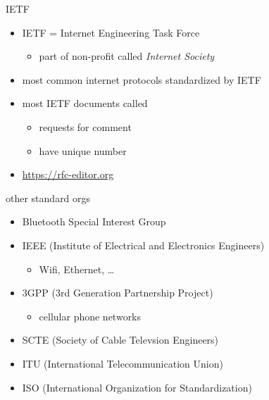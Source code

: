 \begin{frame}{IETF}
    \begin{itemize}
    \item IETF = Internet Engineering Task Force
        \begin{itemize}
        \item part of non-profit called \textit{Internet Society}
        \end{itemize}
    \item most common internet protocols standardized by IETF
    \item most IETF documents called 
        \begin{itemize}
        \item requests for comment
        \item have unique number
        \end{itemize}
    \item \url{https://rfc-editor.org}
    \end{itemize}
\end{frame}

\begin{frame}{other standard orgs}
    \begin{itemize}
        \item Bluetooth Special Interest Group
        \item IEEE (Institute of Electrical and Electronics Engineers)
            \begin{itemize}
            \item Wifi, Ethernet, \ldots
            \end{itemize}
        \item 3GPP (3rd Generation Partnership Project)
            \begin{itemize}
            \item cellular phone networks
            \end{itemize}
        \item SCTE (Society of Cable Televsion Engineers)
        \item ITU (International Telecommunication Union)
        \item ISO (International Organization for Standardization)
    \end{itemize}
\end{frame}
